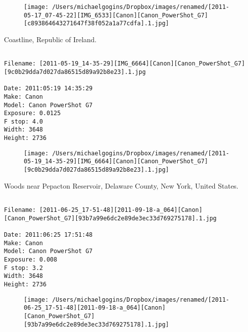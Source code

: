 \begin{figure}
\texttt{[image: /Users/michaelgogins/Dropbox/images/renamed/[2011-05-17\_07-45-22][IMG\_6533][Canon][Canon\_PowerShot\_G7][c893864643271647f38f052a1a77cdfa].1.jpg]}
\end{figure}
    
\clearpage
\onecolumn
\noindent Coastline, Republic of Ireland.
\noindent
\begin{lstlisting}

Filename: [2011-05-19_14-35-29][IMG_6664][Canon][Canon_PowerShot_G7][9c0b29dda7d027da86515d89a92b8e23].1.jpg

Date: 2011:05:19 14:35:29
Make: Canon
Model: Canon PowerShot G7
Exposure: 0.0125
F stop: 4.0
Width: 3648
Height: 2736
\end{lstlisting}
\clearpage

\begin{figure}
\texttt{[image: /Users/michaelgogins/Dropbox/images/renamed/[2011-05-19\_14-35-29][IMG\_6664][Canon][Canon\_PowerShot\_G7][9c0b29dda7d027da86515d89a92b8e23].1.jpg]}
\end{figure}
    
\clearpage
\onecolumn
\noindent Woods near Pepacton Reservoir, Delaware County, New York, United States.
\noindent
\begin{lstlisting}

Filename: [2011-06-25_17-51-48][2011-09-18-a_064][Canon][Canon_PowerShot_G7][93b7a99e6dc2e89de3ec33d769275178].1.jpg

Date: 2011:06:25 17:51:48
Make: Canon
Model: Canon PowerShot G7
Exposure: 0.008
F stop: 3.2
Width: 3648
Height: 2736
\end{lstlisting}
\clearpage

\begin{figure}
\texttt{[image: /Users/michaelgogins/Dropbox/images/renamed/[2011-06-25\_17-51-48][2011-09-18-a\_064][Canon][Canon\_PowerShot\_G7][93b7a99e6dc2e89de3ec33d769275178].1.jpg]}
\end{figure}
    
